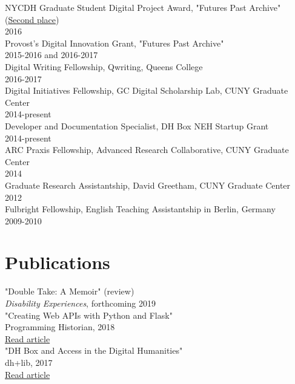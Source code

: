 \documentclass[11pt]{article}
\begin{document}
NYCDH Graduate Student Digital Project Award, "Futures Past Archive" (\href{http://nycdh.org/nycdh-graduate-student-digital-project-awards-2016/}{Second place})\\
2016\\

Provost's Digital Innovation Grant, "Futures Past Archive"\\
2015-2016 and 2016-2017\\

Digital Writing Fellowship, Qwriting, Queens College\\
2016-2017\\

Digital Initiatives Fellowship, GC Digital Scholarship Lab, CUNY Graduate Center\\
2014-present\\

Developer and Documentation Specialist, DH Box NEH Startup Grant\\
2014-present\\

ARC Praxis Fellowship, Advanced Research Collaborative, CUNY Graduate Center\\
2014\\

Graduate Research Assistantship, David Greetham, CUNY Graduate Center\\
2012\\

Fulbright Fellowship, English Teaching Assistantship in Berlin, Germany\\
2009-2010\\

\section*{Publications}
\label{sec:orgheadline3}
"Double Take: A Memoir" (review)\\
\emph{Disability Experiences}, forthcoming 2019\\

"Creating Web APIs with Python and Flask"\\
Programming Historian, 2018\\
\href{https://programminghistorian.org/lessons/creating-apis-with-python-and-flask}{Read article}\\


"DH Box and Access in the Digital Humanities"\\
dh+lib, 2017\\
\href{http://acrl.ala.org/dh/2017/06/21/dh-box-and-access-in-the-digital-humanities/}{Read article}\\
\end{document}
